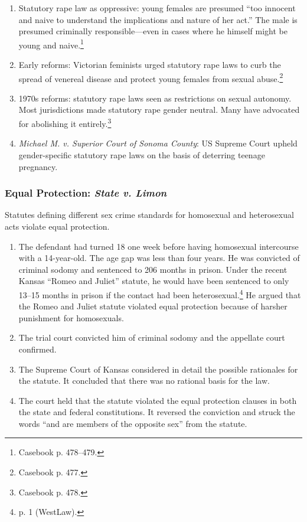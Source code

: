 \begin{enumerate}
    \item Statutory rape law as oppressive: young females are presumed ``too 
    innocent and naive to understand the implications and nature of her act.'' 
    The male is presumed criminally responsible---even in cases where he 
    himself might be young and naive.\footnote{Casebook p. 478--479.}
    \item Early reforms: Victorian feminists urged statutory rape laws to curb 
    the spread of venereal disease and protect young females from sexual 
    abuse.\footnote{Casebook p. 477.}
    \item 1970s reforms: statutory rape laws seen as restrictions on sexual 
    autonomy. Most jurisdictions made statutory rape gender neutral. Many have 
    advocated for abolishing it entirely.\footnote{Casebook p. 478.}
    \item \emph{Michael M. v. Superior Court of Sonoma County}: US Supreme 
    Court upheld gender-specific statutory rape laws on the basis of deterring 
    teenage pregnancy.
\end{enumerate}

\subsubsection{Equal Protection: \emph{State v. Limon}}

Statutes defining different sex crime standards for homosexual and 
heterosexual acts violate equal protection.

\begin{enumerate}
    \item The defendant had turned 18 one week before having homosexual 
    intercourse with a 14-year-old. The age gap was less than four years. He 
    was convicted of criminal sodomy and sentenced to 206 months in prison.  
    Under the recent Kansas ``Romeo and Juliet'' statute, he would have been 
    sentenced to only 13--15 months in prison if the contact had been 
    heterosexual.\footnote{p. 1 (WestLaw).} He argued that the Romeo and 
    Juliet statute violated equal protection because of harsher punishment for 
    homosexuals.
    \item The trial court convicted him of criminal sodomy and the appellate 
    court confirmed.
    \item The Supreme Court of Kansas considered in detail the possible 
    rationales for the statute. It concluded that there was no rational basis 
    for the law.
    \item The court held that the statute violated the equal protection 
    clauses in both the state and federal constitutions. It reversed the 
    conviction and struck the words ``and are members of the opposite sex'' 
    from the statute.
\end{enumerate}
